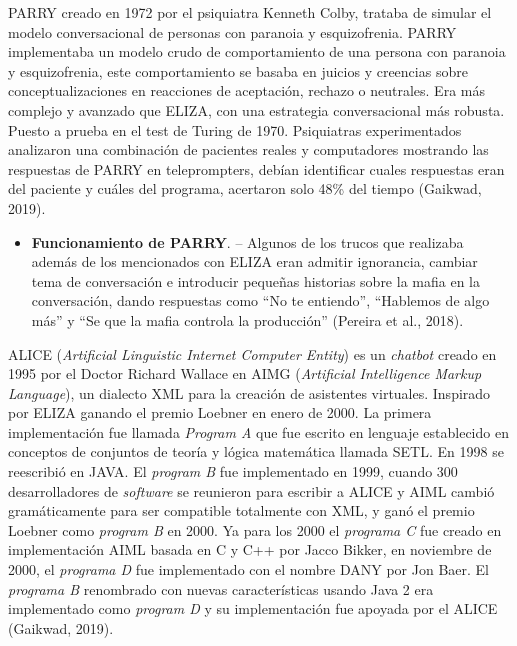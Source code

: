 \documentclass[letter, openright, 12pt]{book}
\begin{document}
PARRY creado en 1972 por el psiquiatra Kenneth Colby, trataba de simular el modelo conversacional de personas con paranoia y esquizofrenia. PARRY implementaba un modelo crudo de comportamiento de una persona con paranoia y esquizofrenia, este comportamiento se basaba en juicios y creencias sobre conceptualizaciones en reacciones de aceptación, rechazo o neutrales. Era más complejo y avanzado que ELIZA, con una estrategia conversacional más robusta. Puesto a prueba en el test de Turing de 1970. Psiquiatras experimentados analizaron una combinación de pacientes reales y computadores mostrando las respuestas de PARRY en teleprompters, debían identificar cuales respuestas eran del paciente y cuáles del programa, acertaron solo 48\% del tiempo (Gaikwad, 2019).

\begin{itemize}
\item \textbf{Funcionamiento de PARRY}. – Algunos de los trucos que realizaba además de los mencionados con ELIZA eran admitir ignorancia, cambiar tema de conversación e introducir pequeñas historias sobre la mafia en la conversación, dando respuestas como “No te entiendo”, “Hablemos de algo más” y “Se que la mafia controla la producción” (Pereira et al., 2018).
\end{itemize}


ALICE (\textit{Artificial Linguistic Internet Computer Entity}) es un \textit{chatbot} creado en 1995 por el Doctor Richard Wallace en AIMG (\textit{Artificial Intelligence Markup Language}), un dialecto XML para la creación de asistentes virtuales. Inspirado por ELIZA ganando el premio Loebner en enero de 2000. La primera implementación fue llamada \textit{Program A} que fue escrito en lenguaje establecido en conceptos de conjuntos de teoría y lógica matemática llamada SETL. En 1998 se reescribió en JAVA. El \textit{program B} fue implementado en 1999, cuando 300 desarrolladores de \textit{software} se reunieron para escribir a ALICE y AIML cambió gramáticamente para ser compatible totalmente con XML, y ganó el premio Loebner como \textit{program B} en 2000. Ya para los 2000 el \textit{programa C} fue creado en implementación AIML basada en C y C++ por Jacco Bikker, en noviembre de 2000, el \textit{programa D} fue implementado con el nombre DANY por Jon Baer. El \textit{programa B} renombrado con nuevas características usando Java 2 era implementado como \textit{program D} y su implementación fue apoyada por el ALICE (Gaikwad, 2019).
\end{document}
